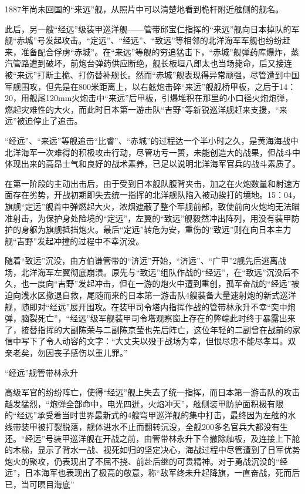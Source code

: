 \documentclass[12pt,UTF8]{ctexbook}
\begin{document}
1887年尚未回国的“来远”舰，从照片中可以清楚地看到桅杆附近舷侧的舰名。

此后，另一艘“经远”级装甲巡洋舰——管带邱宝仁指挥的“来远”舰向日本掉队的军舰“赤城”号发起攻击。“定远”、“经远”、“致远”等相邻的北洋海军军舰也纷纷赶来，准备配合俘虏“赤城”。在“来远”等舰的穷追猛击下，“赤城”舰弹药库爆炸，蒸汽管路遭到破坏，前炮台弹药供应断绝，舰长板垣八郎太也当场毙命，后又接连被“来远”打断主桅、打伤替补舰长。然而“赤城”舰表现得异常顽强，尽管遭到中国军舰围攻，但先是在800米距离上，以右舷炮击碎“来远”舰舰桥甲板，之后于14：20，用舰尾120mm火炮击中“来远”后甲板，引爆堆积在那里的小口径火炮炮弹，燃起灾难性的大火，而此时日本第一游击队“吉野”等新锐巡洋舰赶来支援，“来远”被迫停止了追击。

“经远”、“来远”等舰追击“比睿”、“赤城”的过程达一个半小时之久，是黄海海战中北洋海军一次难得的积极攻击行动，尽管功亏一篑，未能创造大的战果，但战斗中体现出来的高昂士气和良好的战术素养，已足以说明北洋海军官兵的战斗素质了。

在第一阶段的主动出击后，由于受到日本舰队腹背夹击，加之在火炮数量和射速方面存在劣势，开战初期即失去统一指挥的北洋舰队陷入被动挨打的境地。15：04，旗舰“定远”舰首中弹燃起大火，浓烟遮蔽了整个军舰前部，致使前向火炮均无法瞄准射击，为保护身处险境的“定远”，左翼的“致远”舰毅然冲出阵列，用没有装甲防护的身躯为旗舰抵挡炮火。最后“定远”转危为安，重伤的“致远”则在向日本主力舰“吉野”发起冲撞的过程中不幸沉没。

随着“致远”沉没，由方伯谦管带的“济远”开始，“济远”、“广甲”2舰先后逃离战场，北洋海军左翼彻底崩溃。原先与“致远”组队作战的“经远”，在“致远”沉没后不久，也一度向“吉野”发起冲击，但在一游的炮火中遭到重创，孤军奋战的“经远”被迫向浅水区撤退自救，尾随而来的日本第一游击队4艘装备大量速射炮的新式巡洋舰，随即对“经远”展开围攻。在装甲司令塔内指挥作战的管带林永升不幸“突中炮弹，脑裂死亡”，“经远”级军舰装甲司令塔观察窗上存在的弊端此时终于暴露出来了，接替指挥的大副陈荣与二副陈京莹也先后阵亡，这位年轻的二副曾在战前的家信中写下了令人动容的文字：“大丈夫以殁于战场为幸，但恨尽忠不能尽孝耳。双亲老矣，勿因丧子感伤以重儿罪。”

“经远”舰管带林永升

高级军官的纷纷阵亡，使得“经远”舰上失去了统一指挥，而日本第一游击队的攻击越发猛烈，“炮弹全部命中，电光四迸，火焰冲天”，舷侧装甲防护面积极有限的“经远”承受着当时世界最新式的4艘穹甲巡洋舰的集中打击，最终因为左舷的水线带装甲被打裂脱落，舰体进水不止而翻转沉没，全舰200多名官兵大都没有生还。“经远”号装甲巡洋舰在开战之前，由管带林永升下令撤除舢板，及连接上下舱的木梯，显示了背水一战、视死如归的坚定决心，海战过程中尽管遭到了日军优势炮火的聚攻，仍表现出了不屈不挠、前赴后继的可贵精神。对于勇战沉没的“经远”，日本海军也表现出了极高的敬意，称“敌军终未升起降旗，一直奋战，死而后已，当可瞑目海底”
\end{document}
